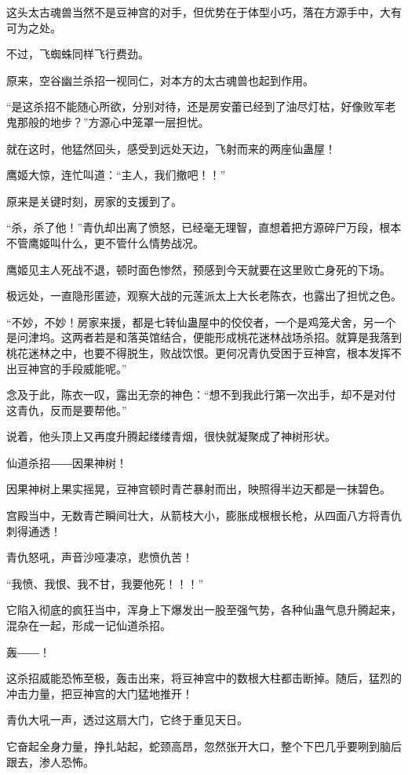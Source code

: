 \begin{this_body}
这头太古魂兽当然不是豆神宫的对手，但优势在于体型小巧，落在方源手中，大有可为之处。

不过，飞蜘蛛同样飞行费劲。

原来，空谷幽兰杀招一视同仁，对本方的太古魂兽也起到作用。

“是这杀招不能随心所欲，分别对待，还是房安蕾已经到了油尽灯枯，好像败军老鬼那般的地步？”方源心中笼罩一层担忧。

就在这时，他猛然回头，感受到远处天边，飞射而来的两座仙蛊屋！

鹰姬大惊，连忙叫道：“主人，我们撤吧！！”

原来是关键时刻，房家的支援到了。

“杀，杀了他！”青仇却出离了愤怒，已经毫无理智，直想着把方源碎尸万段，根本不管鹰姬叫什么，更不管什么情势战况。

鹰姬见主人死战不退，顿时面色惨然，预感到今天就要在这里败亡身死的下场。

极远处，一直隐形匿迹，观察大战的元莲派太上大长老陈衣，也露出了担忧之色。

“不妙，不妙！房家来援，都是七转仙蛊屋中的佼佼者，一个是鸡笼犬舍，另一个是问津坞。这两者若是和落英馆结合，便能形成桃花迷林战场杀招。就算是我落到桃花迷林之中，也要不得脱生，败战饮恨。更何况青仇受困于豆神宫，根本发挥不出豆神宫的手段威能呢。”

念及于此，陈衣一叹，露出无奈的神色：“想不到我此行第一次出手，却不是对付这青仇，反而是要帮他。”

说着，他头顶上又再度升腾起缕缕青烟，很快就凝聚成了神树形状。

仙道杀招――因果神树！

因果神树上果实摇晃，豆神宫顿时青芒暴射而出，映照得半边天都是一抹碧色。

宫殿当中，无数青芒瞬间壮大，从箭枝大小，膨胀成根根长枪，从四面八方将青仇刺得通透！

青仇怒吼，声音沙哑凄凉，悲愤仇苦！

“我愤、我恨、我不甘，我要他死！！！”

它陷入彻底的疯狂当中，浑身上下爆发出一股至强气势，各种仙蛊气息升腾起来，混杂在一起，形成一记仙道杀招。

轰――！

这杀招威能恐怖至极，轰击出来，将豆神宫中的数根大柱都击断掉。随后，猛烈的冲击力量，把豆神宫的大门猛地推开！

青仇大吼一声，透过这扇大门，它终于重见天日。

它奋起全身力量，挣扎站起，蛇颈高昂，忽然张开大口，整个下巴几乎要咧到脑后跟去，渗人恐怖。


\end{this_body}
